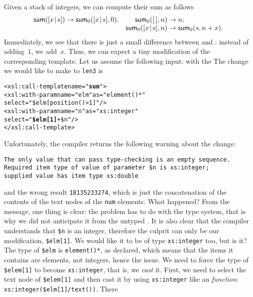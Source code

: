 Given a stack of integers, we can compute their sum as follows
\begin{equation*}
\begin{array}{@{}r@{\;}l@{\;}lr@{\;}l@{\;}l@{}}
\fun{sum}(\cons{x}{s}) & \rightarrow & \fun{sum}_0(\cons{x}{s},0). &
\fun{sum}_0(\el,n) & \rightarrow & n;\\
&&& \fun{sum}_0(\cons{x}{s},n) & \rightarrow & \fun{sum}_0(s,n+x).
\end{array}
\end{equation*}
Immediately, we see that there is just a small difference between
 and : instead of adding~\(1\), we
add~\(x\). Thus, we can expect a tiny modification of the
corresponding \XSLT template. Let us assume the following input:
\noindent with the \DTD
{}
\noindent The change we would like to make to \texttt{len3} is
\begin{alltt}
        <xsl:call-template name="\textbf{sum}">
          <xsl:with-param name="elm" as="element()*"
                          select="\$elm[position()>1]"/>
          <xsl:with-param name="n" as="xs:integer"
                          select="\textbf{\$elm[1]} + \$n"/>
        </xsl:call-template>
\end{alltt}
Unfortunately, the compiler \Saxon returns the following warning about
the change:
\begin{verbatim}
The only value that can pass type-checking is an empty sequence.
Required item type of value of parameter $n is xs:integer;
supplied value has item type xs:double
\end{verbatim}
and the wrong result \texttt{18135233274}, which is just the
concatenation of the contents of the text nodes of the \texttt{num}
elements. What happened? From the message, one thing is clear: the
problem has to do with the type system, that is why we did not
anticipate it from the untyped . It is also clear
that the compiler understands that \texttt{\$n} is an integer,
therefore the culprit can only be our modification,
\texttt{\$elm[1]}. We would like it to be of type \texttt{xs:integer}
too, but is it? The type of \texttt{\$elm} is \texttt{element()*}, as
declared, which means that the items it contains are elements, not
integers, hence the issue. We need to force the type of
\texttt{\$elem[1]} to become \texttt{xs:integer}, that is, we
\emph{cast} it. First, we need to select the text node of
\texttt{\$elem[1]} and then cast it by using \texttt{xs:integer} like
an \XPath \emph{function}: \texttt{xs:integer(\$elm[1]/text())}. There
